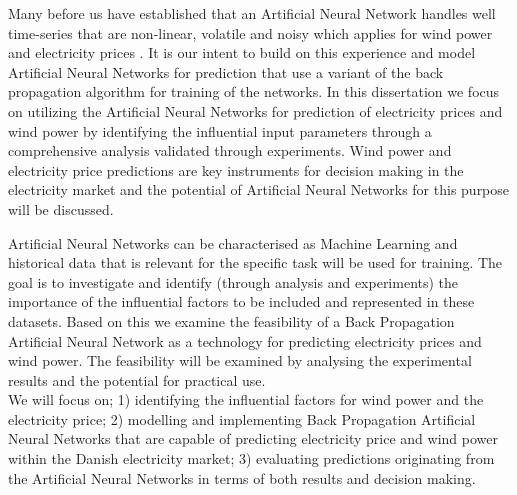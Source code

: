 Many before us have established that an Artificial Neural Network handles well time-series that are non-linear, volatile and noisy which applies for wind power and electricity prices \cite{stockForecasting,pjmForecast,yamin2004adaptive,windForecastPortugal}. It is our intent to build on this experience and model Artificial Neural Networks for prediction that use a variant of the back propagation algorithm for training of the networks. In this dissertation we focus on utilizing the Artificial Neural Networks for prediction of electricity prices and wind power by identifying the influential input parameters through a comprehensive analysis validated through experiments. Wind power and electricity price predictions are key instruments for decision making in the electricity market\cite{dayAheadImpactOfWindPowerForecasts,21} and the potential of Artificial Neural Networks for this purpose will be discussed.

Artificial Neural Networks can be characterised as Machine Learning\cite{18} and historical data that is relevant for the specific task will be used for training. The goal is to investigate and identify (through analysis and experiments) the importance of the influential factors to be included and represented in these datasets. Based on this we examine the feasibility of a Back Propagation Artificial Neural Network as a technology for predicting electricity prices and wind power. The feasibility will be examined by analysing the experimental results and the potential for practical use.
\\[0.5cm]
We will focus on; 1) identifying the influential factors for wind power and the electricity price; 2) modelling and implementing Back Propagation Artificial Neural Networks that are capable of predicting electricity price and wind power within the Danish electricity market; 3) evaluating predictions originating from the Artificial Neural Networks in terms of both results and decision making.